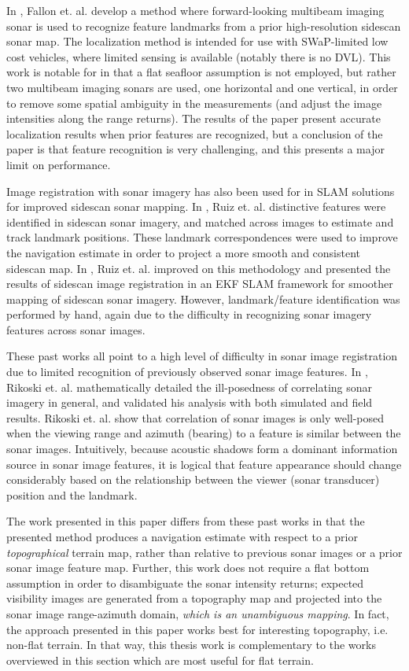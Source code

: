 In \cite{Fallon2013}, Fallon et. al. develop a method where forward-looking multibeam imaging sonar is used to recognize feature landmarks from a prior high-resolution sidescan sonar map.
The localization method is intended for use with SWaP-limited low cost vehicles, where limited sensing is available (notably there is no DVL). 
This work is notable for in that a flat seafloor assumption is not employed, but rather two multibeam imaging sonars are used, one horizontal and one vertical, in order to remove some spatial ambiguity in the measurements (and adjust the image intensities along the range returns).
The results of the paper present accurate localization results when prior features are recognized, but a conclusion of the paper is that feature recognition is very challenging, and this presents a major limit on performance.

Image registration with sonar imagery has also been used for in SLAM solutions for improved sidescan sonar mapping.  
In \cite{Ruiz2003}, Ruiz et. al. distinctive features were identified in sidescan sonar imagery, and matched across images to estimate and track landmark positions.  
These landmark correspondences were used to improve the navigation estimate in order to project a more smooth and consistent sidescan map. 
In \cite{Ruiz2004}, Ruiz et. al. improved on this methodology and presented the results of sidescan image registration in an EKF SLAM framework for smoother mapping of sidescan sonar imagery.
However, landmark/feature identification was performed by hand, again due to the difficulty in recognizing sonar imagery features across sonar images.

These past works all point to a high level of difficulty in sonar image registration due to limited recognition of previously observed sonar image features.
In \cite{Rikoski2005}, Rikoski et. al. mathematically detailed the ill-posedness of correlating sonar imagery in general, and validated his analysis with both simulated and field results.
Rikoski et. al. show that correlation of sonar images is only well-posed when the viewing range and azimuth (bearing) to a feature is similar between the sonar images.
Intuitively, because acoustic shadows form a dominant information source in sonar image features, it is logical that feature appearance should change considerably based on the relationship between the viewer (sonar transducer) position and the landmark.

The work presented in this paper differs from these past works in that the presented method produces a navigation estimate with respect to a prior \emph{topographical} terrain map, rather than relative to previous sonar images or a prior sonar image feature map.  
Further, this work does not require a flat bottom assumption in order to disambiguate the sonar intensity returns; expected visibility images are generated from a topography map and projected into the sonar image range-azimuth domain, \emph{which is an unambiguous mapping}.  
In fact, the approach presented in this paper works best for interesting topography, i.e. non-flat terrain.
In that way, this thesis work is complementary to the works overviewed in this section which are most useful for flat terrain.

